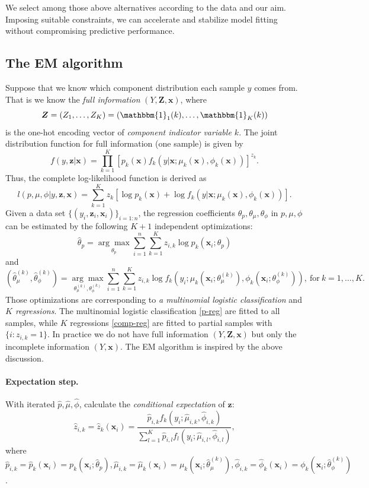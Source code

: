\documentclass[11pt]{article}
\numberwithin{equation}{section}
\def\bx{\boldsymbol{x}}
\def\bZ{\boldsymbol{Z}}
\def\bz{\boldsymbol{z}}
\begin{document}
	We select among those above alternatives according to the data and our aim. 
	Imposing suitable constraints, we can {accelerate and stabilize model fitting} without compromising predictive performance.

\subsection{The EM algorithm}

	Suppose that we know which component distribution each sample $y$ comes from. That is we know the \textit{full information} $(Y,\bZ,\bx)$, where
	$$\bZ=(Z_1,\ldots,Z_K)=(\mathbbm{1}_1(k),\ldots,\mathbbm{1}_K(k))$$
	is the one-hot encoding vector of \textit{component indicator variable $k$}.
	The joint distribution function for full information (one sample) is given by
	$$f(y,\bz|
	\bx) = \prod_{k=1}^K\left[p_k(\bx)f_k(y|\bx;\mu_k(\bx),\phi_k(\bx))\right]^{z_k}.$$
	Thus, the {complete log-likelihood function} is derived as
	\begin{equation}\label{full-L}
		l(p,\mu,\phi|y,\bz,\bx)=\sum_{k=1}^K z_k\left[\log p_k(\bx) + \log f_k(y|\bx;\mu_k(\bx),\phi_k(\bx))\right].
	\end{equation}
	Given a data set $\{(y_i,\bz_i,\bx_i)\}_{i=1:n}$, the regression coefficients $\theta_p, \theta_\mu, \theta_\phi$ in $p,\mu,\phi$ can be estimated by the following $K+1$ {independent optimizations:}
	\begin{equation}\label{p-reg}
		\hat{\theta}_p=\underset{\theta_p}{\arg\max}\sum_{i=1}^n\sum_{k=1}^Kz_{i,k}\log p_k(\bx_i;\theta_p)
	\end{equation}
and
	\begin{equation}\label{comp-reg}
		\left(\hat{\theta}_\mu^{(k)},\hat{\theta}_\phi^{(k)}\right)=\underset{\theta^{(k)}_\mu,\theta^{(k)}_\phi}{\arg\max}\sum_{i=1}^n\sum_{k=1}^Kz_{i,k}\log f_k\left(y_i;\mu_k\left(\bx_i;\theta_\mu^{(k)}\right),\phi_k\left(\bx_i;\theta_\phi^{(k)}\right)\right), ~\text{for} ~ k=1,\ldots,K.
	\end{equation}
	Those optimizations are corresponding to  {\it a multinomial logistic classification} and {\it $K$ regressions}.
The multinomial logistic classification \eqref{p-reg} are fitted to all samples, while $K$ regressions \eqref{comp-reg} are fitted to {partial} samples with $\{i:z_{i,k}=1\}$.
In practice we do not have full information  $(Y,\bZ,\bx)$ but only the incomplete information $(Y,\bx)$. The  EM algorithm is inspired by the above discussion.
\paragraph{Expectation step.}
	With iterated $\hat{p},\hat{\mu},\hat{\phi}$, calculate the \textit{conditional expectation} of $\bz$:
	$$\hat{z}_{i,k}=\hat{z}_k(\bx_i)=\frac{\hat{p}_{i,k}f_k(y_i;\hat{\mu}_{i,k},\hat{\phi}_{i,k})}{\sum_{l=1}^K\hat{p}_{i,l}f_l(y_i;\hat{\mu}_{i,l},\hat{\phi}_{i,l})},$$
	where
	$\hat{p}_{i,k}=\hat{p}_k(\bx_i)= p_k(\bx_i;\hat{\theta}_p),\hat{\mu}_{i,k}=\hat{\mu}_k(\bx_i)=\mu_k\left(\bx_i;\hat{\theta}_\mu^{(k)}\right),\hat{\phi}_{i,k}=\hat{\phi}_k(\bx_i)=\phi_k\left(\bx_i;\hat{\theta}_\phi^{(k)}\right)$.
\end{document}
